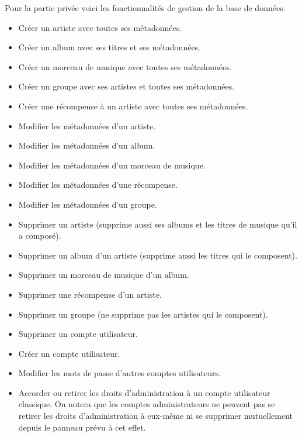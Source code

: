         \begin{paragraphe}
            Pour la partie privée voici les fonctionnalités de gestion de la base de
            données.
        \end{paragraphe}

        \begin{paragraphe}
            \begin{itemize}
                \item Créer un artiste avec toutes ses métadonnées.
                \item Créer un album avec ses titres et ses métadonnées.
                \item Créer un morceau de musique avec toutes ses métadonnées.
                \item Créer un groupe avec ses artistes et toutes ses métadonnées.
                \item Créer une récompense à un artiste avec toutes ses métadonnées.
                \item Modifier les métadonnées d'un artiste.
                \item Modifier les métadonnées d'un album.
                \item Modifier les métadonnées d'un morceau de musique.
                \item Modifier les métadonnées d'une récompense.
                \item Modifier les métadonnées d'un groupe.
                \item Supprimer un artiste (supprime aussi ses albums et les titres de
                musique qu'il a composé).
                \item Supprimer un album d'un artiste (supprime aussi les titres qui le composent).
                \item Supprimer un morceau de musique d'un album.
                \item Supprimer une récompense d'un artiste.
                \item Supprimer un groupe (ne supprime pas les artistes qui le composent).
                \item Supprimer un compte utilisateur.
                \item Créer un compte utilisateur.
                \item Modifier les mots de passe d'autres comptes utilisateurs.
                \item Accorder ou retirer les droits d'administration à un compte utilisateur classique.
                On notera que les comptes administrateurs ne peuvent pas se retirer les droits 
                d'administration à eux-même ni se supprimer mutuellement depuis le panneau prévu à cet effet.
            \end{itemize}
        \end{paragraphe}

